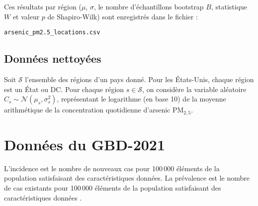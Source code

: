 Ces résultats par région ($\mu$, $\sigma$, le nombre d'échantillons bootstrap $B$, statistique $W$ et valeur $p$ de Shapiro-Wilk) sont enregistrés dans le fichier :
\begin{center}
	\texttt{arsenic\_pm2.5\_locations.csv}
\end{center}

\subsection{Données nettoyées}

Soit $\mathcal{S}$ l'ensemble des régions d'un pays donné. Pour les États-Unis, chaque région est un État ou DC. Pour chaque région $s \in \mathcal{S}$, on considère la variable aléatoire $C_s \sim \mathcal{N}(\mu_s, \sigma_s^2)$, représentant le logarithme (en base 10) de la moyenne arithmétique de la concentration quotidienne d'arsenic PM$_{2,5}$.

\section{Données du GBD-2021}
\label{sec:gbd}
L'incidence est le nombre de nouveaux cas pour 100\,000 éléments de la population satisfaisant des caractéristiques données. La prévalence est le nombre de cas existants pour 100\,000 éléments de la population satisfaisant des caractéristiques données \citep{rothman2024epidemiology, kleinbaum1991epidemiologic}.
